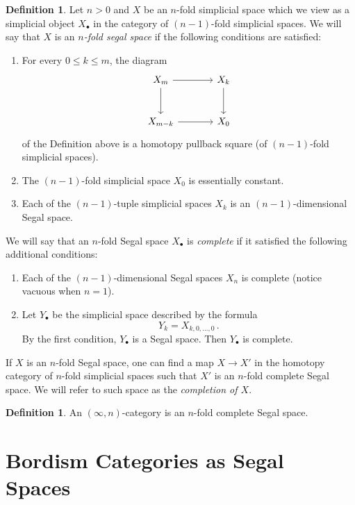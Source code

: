 \documentclass[a4paper,11pt]{article}
\theoremstyle{plain}
\theoremstyle{definition}
\newtheorem{defi}[thm]{Definition}
\theoremstyle{remark}
\begin{document}
\begin{defi}
Let $n>0$ and $X$ be an $n$-fold simplicial space which we view as a simplicial object $X_{\bullet}$ in the category of $(n-1)$-fold simplicial spaces. We will say that $X$ is an \textit{$n$-fold segal space} if the following conditions are satisfied: 
\begin{enumerate}[label = \arabic*)]
    \item For every $0 \leq k \leq m$, the diagram 
    \begin{equation*}
        \begin{tikzcd}[row sep = large, column sep = large]
        X_m \arrow[r]\arrow[d] & X_k \arrow[d]\\
        X_{m-k} \arrow[r] & X_0
        \end{tikzcd}
    \end{equation*}
    of the Definition above is a homotopy pullback square (of $(n-1)$-fold simplicial spaces). 
    \item The $(n-1)$-fold simplicial space $X_0$ is essentially constant. 
    \item Each of the $(n-1)$-tuple simplicial spaces $X_k$ is an $(n-1)$-dimensional Segal space.
\end{enumerate}
We will say that an $n$-fold Segal space $X_{\bullet}$ is \textit{complete} if it satisfied the following additional conditions:
\begin{enumerate}[resume]
    \item Each of the $(n-1)$-dimensional Segal spaces $X_n$ is complete (notice vacuous when $n=1$).
    \item Let $Y_{\bullet}$ be the simplicial space described by the formula 
    $$Y_k = X_{k,0, \dots , 0} \, .$$
    By the first condition, $Y_{\bullet}$ is a Segal space. Then $Y_{\bullet}$ is complete. 
\end{enumerate}
\end{defi}


If $X$ is an $n$-fold Segal space, one can find a map $X \to X'$ in the homotopy category of $n$-fold simplicial spaces such that $X'$ is an $n$-fold complete Segal space. We will refer to such space as the \textit{completion of $X$}.

\begin{defi}
An $(\infty, n)$-category is an $n$-fold complete Segal space. 
\end{defi}

\section{Bordism Categories as Segal Spaces}
\label{section_4}
\end{document}
